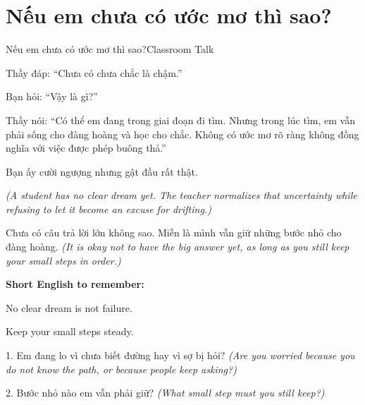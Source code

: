 \section{Nếu em chưa có ước mơ thì sao?}
\begin{truyen}{Nếu em chưa có ước mơ thì sao?}{Classroom Talk}

Thầy đáp: ``Chưa có chưa chắc là chậm.''

Bạn hỏi: ``Vậy là gì?''

Thầy nói: ``Có thể em đang trong giai đoạn đi tìm. Nhưng trong lúc tìm, em vẫn phải sống cho đàng hoàng và học cho chắc. Không có ước mơ rõ ràng không đồng nghĩa với việc được phép buông thả.''

Bạn ấy cười ngượng nhưng gật đầu rất thật.

\textit{(A student has no clear dream yet. The teacher normalizes that uncertainty while refusing to let it become an excuse for drifting.)}
\end{truyen}

\begin{baihoc}
Chưa có câu trả lời lớn không sao. Miễn là mình vẫn giữ những bước nhỏ cho đàng hoàng.
\textit{(It is okay not to have the big answer yet, as long as you still keep your small steps in order.)}
\end{baihoc}

\begin{ghinhoanh}
\textbf{Short English to remember:}

No clear dream is not failure.

Keep your small steps steady.
\end{ghinhoanh}

\begin{tuhocnhanh}
1. Em đang lo vì chưa biết đường hay vì sợ bị hỏi? \textit{(Are you worried because you do not know the path, or because people keep asking?)}

2. Bước nhỏ nào em vẫn phải giữ? \textit{(What small step must you still keep?)}
\end{tuhocnhanh}
\ngancach